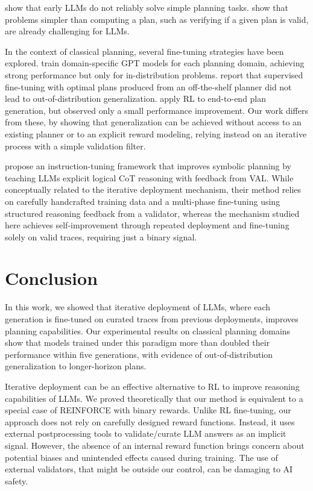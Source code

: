 \documentclass{article}
\begin{document}
\citet{valmeekam-et-al-neurips2023} show that early LLMs do not reliably solve
simple planning tasks. \citet{kokel-et-al-aaai2025} show that problems simpler
than computing a plan, such as verifying if a given plan is valid, are already
challenging for LLMs.

In the context of classical planning, several fine-tuning strategies have been
explored. \citet{rossetti-et-al-icaps2024} train domain-specific GPT models for
each planning domain, achieving strong performance but only for in-distribution
problems. \citet{bohnet-et-al-arxiv2024} report that supervised fine-tuning with
optimal plans produced from an off-the-shelf planner \citep{helmert-jair2006}
did not lead to out-of-distribution
generalization. \citet{huang-et-al-icaps2025} apply RL to end-to-end plan
generation, but observed only a small performance improvement. Our work differs
from these, by showing that generalization can be achieved without access to an
existing planner or to an explicit reward modeling, relying instead on an
iterative process with a simple validation filter.

\citet{verma-et-al-arxiv2025} propose an instruction-tuning framework that
improves symbolic planning by teaching LLMs explicit logical CoT reasoning with
feedback from VAL. While conceptually related to the iterative deployment
mechanism, their method relies on carefully handcrafted training data and a
multi-phase fine-tuning using structured reasoning feedback from a validator,
whereas the mechanism studied here achieves self-improvement through repeated
deployment and fine-tuning solely on valid traces, requiring just a binary
signal.



\section{Conclusion}

In this work, we showed that iterative deployment of LLMs, where each generation
is fine-tuned on curated traces from previous deployments, improves planning
capabilities. Our experimental results on classical planning domains show that
models trained under this paradigm more than doubled their performance within
five generations, with evidence of out-of-distribution generalization to
longer-horizon plans.

Iterative deployment can be an effective alternative to RL to improve reasoning
capabilities of LLMs. We proved theoretically that our method is equivalent to a
special case of REINFORCE with binary rewards. Unlike RL fine-tuning, our
approach does not rely on carefully designed reward functions. Instead, it uses
external postprocessing tools to validate/curate LLM answers as an implicit
signal.  However, the absence of an internal reward function brings concern
about potential biases and unintended effects caused during training. The use of
external validators, that might be outside our control, can be damaging to AI
safety.
\end{document}
